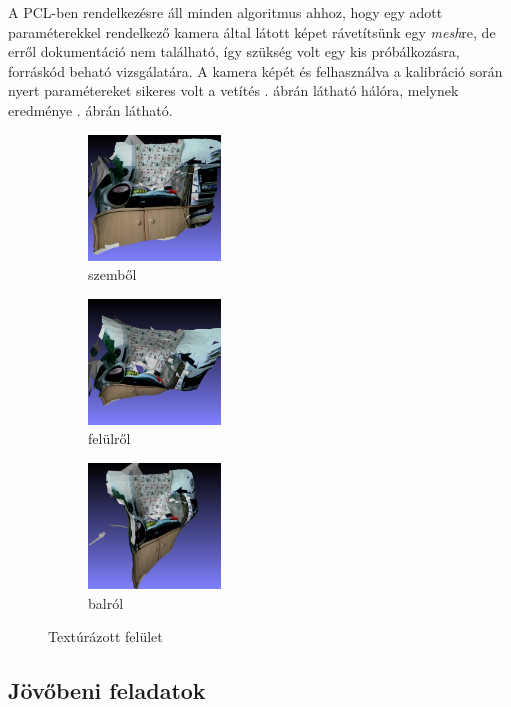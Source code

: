 \documentclass[a4paper,oneside]{article}
\begin{document}
A PCL-ben rendelkezésre áll minden algoritmus ahhoz, hogy egy adott paraméterekkel rendelkező kamera által látott képet rávetítsünk egy \textit{mesh}re, de erről dokumentáció nem található, így szükség volt egy kis próbálkozásra, forráskód beható vizsgálatára. A kamera képét és felhasználva a kalibráció során nyert paramétereket sikeres volt a vetítés . ábrán látható hálóra, melynek eredménye . ábrán látható.

\begin{figure}[tbh]
  \centering
  \begin{subfigure}[b]{.32\linewidth}
	\centering
	\includegraphics[width=100pt]{figs/texture00.png}
	\caption{szemből \label{fig:texture1}}
  \end{subfigure}%
  \begin{subfigure}[b]{.32\linewidth}
	\centering
	\includegraphics[width=100pt]{figs/texture01.png}
	\caption{felülről \label{fig:texture2}}
  \end{subfigure}%
  \begin{subfigure}[b]{.32\linewidth}
	\centering
	\includegraphics[width=100pt]{figs/texture02.png}
	\caption{balról \label{fig:texture3}}
  \end{subfigure}%
\caption{Textúrázott felület \label{fig:texture}}
\end{figure}

\subsection{Jövőbeni feladatok}
\end{document}
